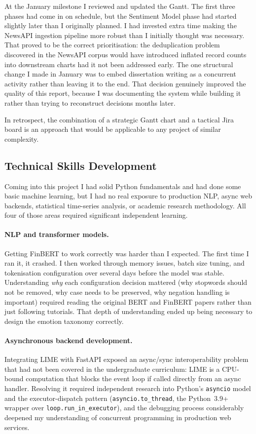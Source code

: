 At the January milestone I reviewed and updated the Gantt. The first three phases had come in on schedule, but the Sentiment Model phase had started slightly later than I originally planned. I had invested extra time making the NewsAPI ingestion pipeline more robust than I initially thought was necessary. That proved to be the correct prioritisation: the deduplication problem discovered in the NewsAPI corpus would have introduced inflated record counts into downstream charts had it not been addressed early. The one structural change I made in January was to embed dissertation writing as a concurrent activity rather than leaving it to the end. That decision genuinely improved the quality of this report, because I was documenting the system while building it rather than trying to reconstruct decisions months later.

In retrospect, the combination of a strategic Gantt chart and a tactical Jira board is an approach that would be applicable to any project of similar complexity.

\subsection{Technical Skills Development}

Coming into this project I had solid Python fundamentals and had done some basic machine learning, but I had no real exposure to production NLP, async web backends, statistical time-series analysis, or academic research methodology. All four of those areas required significant independent learning.

\paragraph{NLP and transformer models.}
Getting FinBERT to work correctly was harder than I expected. The first time I ran it, it crashed. I then worked through memory issues, batch size tuning, and tokenisation configuration over several days before the model was stable. Understanding \textit{why} each configuration decision mattered (why stopwords should not be removed, why case needs to be preserved, why negation handling is important) required reading the original BERT \citep{devlin2019bert} and FinBERT \citep{araci2019finbert} papers rather than just following tutorials. That depth of understanding ended up being necessary to design the emotion taxonomy correctly.

\paragraph{Asynchronous backend development.}
Integrating LIME with FastAPI exposed an async/sync interoperability problem that had not been covered in the undergraduate curriculum: LIME is a CPU-bound computation that blocks the event loop if called directly from an async handler. Resolving it required independent research into Python's \texttt{asyncio} model and the executor-dispatch pattern (\texttt{asyncio.to\_thread}, the Python~3.9+ wrapper over \texttt{loop.run\_in\_executor}), and the debugging process considerably deepened my understanding of concurrent programming in production web services.

